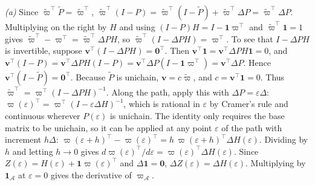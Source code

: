 \emph{(a)} Since $\tilde\varpi^{\top}\tilde P=\tilde\varpi^{\top}$, $\tilde\varpi^{\top}(I-P)=\tilde\varpi^{\top}(I-\tilde P)+\tilde\varpi^{\top}\Delta P=\tilde\varpi^{\top}\Delta P$. Multiplying on the right by $H$ and using $(I-P)H=I-\bm1\varpi^{\top}$ and $\tilde\varpi^{\top}\bm1=1$ gives $\tilde\varpi^{\top}-\varpi^{\top}=\tilde\varpi^{\top}\Delta P H$, so $\tilde\varpi^{\top}(I-\Delta P H)=\varpi^{\top}$. To see that $I-\Delta P H$ is invertible, suppose $\bm v^{\top}(I-\Delta P H)=\bm0^{\top}$. Then $\bm v^{\top}\bm1=\bm v^{\top}\Delta P H\bm1=0$, and $\bm v^{\top}(I-P)=\bm v^{\top}\Delta P H(I-P)=\bm v^{\top}\Delta P(I-\bm1\varpi^{\top})=\bm v^{\top}\Delta P$. Hence $\bm v^{\top}(I-\tilde P)=\bm0^{\top}$. Because $\tilde P$ is unichain, $\bm v=c\tilde\varpi$, and $c=\bm v^{\top}\bm1=0$. Thus $\tilde\varpi^{\top}=\varpi^{\top}(I-\Delta P H)^{-1}$.
Along the path, apply this with $\Delta P=\varepsilon\Delta$: $\varpi(\varepsilon)^{\top}=\varpi^{\top}(I-\varepsilon\Delta H)^{-1}$, which is rational in $\varepsilon$ by Cramer's rule and continuous wherever $P(\varepsilon)$ is unichain. The identity only requires the base matrix to be unichain, so it can be applied at any point $\varepsilon$ of the path with increment $h\Delta$: $\varpi(\varepsilon+h)^{\top}-\varpi(\varepsilon)^{\top}=h\,\varpi(\varepsilon+h)^{\top}\Delta H(\varepsilon)$. Dividing by $h$ and letting $h\to0$ gives $d\varpi(\varepsilon)^{\top}/d\varepsilon=\varpi(\varepsilon)^{\top}\Delta H(\varepsilon)$. Since $Z(\varepsilon)=H(\varepsilon)+\bm1\varpi(\varepsilon)^{\top}$ and $\Delta\bm1=\bm0$, $\Delta Z(\varepsilon)=\Delta H(\varepsilon)$. Multiplying by $\bm1_{\mathcal A}$ at $\varepsilon=0$ gives the derivative of $\varpi_{\mathcal A}$.

